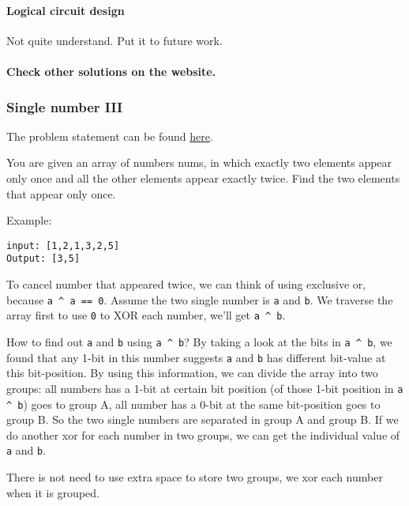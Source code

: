 \documentclass[12pt]{article}
\begin{document}
\paragraph{Logical circuit design}
\label{sec:org802fafd}
Not quite understand. Put it to future work.
\paragraph{Check other solutions on the website.}
\label{sec:orgc93d594}

\subsubsection{Single number III}
\label{sec:orgeec16d8}
The problem statement can be found \href{https://leetcode.com/problems/single-number-iii/}{here}.

You are given an array of numbers nums, in which exactly two elements appear only once and all the other elements appear exactly twice. Find the two elements that appear only once.

Example:
\begin{verbatim}
input: [1,2,1,3,2,5]
Output: [3,5]
\end{verbatim}

To cancel number that appeared twice, we can think of using exclusive or, because \texttt{a \textasciicircum{} a == 0}. Assume the two single number is \texttt{a} and \texttt{b}. We traverse the array first to use \texttt{0} to XOR each number, we'll get \texttt{a \textasciicircum{} b}.

How to find out \texttt{a} and \texttt{b} using \texttt{a \textasciicircum{} b}? By taking a look at the bits in \texttt{a \textasciicircum{} b}, we found that any 1-bit in this number suggests \texttt{a} and \texttt{b} has different bit-value at this bit-position. By using this information, we can divide the array into two groups: all numbers has a 1-bit at certain bit position (of those 1-bit position in \texttt{a \textasciicircum{} b}) goes to group A, all number has a 0-bit at the same bit-position goes to group B. So the two single numbers are separated in group A and group B. If we do another xor for each number in two groups, we can get the individual value of \texttt{a} and \texttt{b}.

There is not need to use extra space to store two groups, we xor each number when it is grouped.
\end{document}
